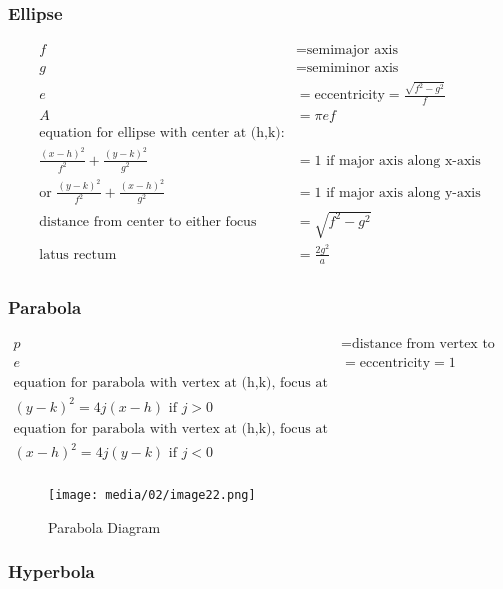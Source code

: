 \documentclass[
]{book}
\begin{document}
\hypertarget{ellipse}{%
\subsubsection*{Ellipse}\label{ellipse}}

\begin{align}
f &= \text{semimajor axis} \\
g &= \text{semiminor axis} \\
e &= \text{eccentricity} = \frac{ \sqrt{f^2 -g^2} }{f} \\
A &= \pi e f \\
\text{equation for ellipse with center at (h,k):} \\
\frac{(x-h)^2 }{f^2}  + \frac{(y-k)^2}{g^2}  &= 1 \text{ if major axis along x-axis} \\
\text{or } \frac{(y-k)^2 }{f^2}  + \frac{(x-h)^2}{g^2}  &= 1 \text{ if major axis along y-axis} \\
\text{distance from center to either focus} &= \sqrt{f^2 -g^2} \\
\text{latus rectum} &= \frac{2g^2}{a} \\
\end{align}

\hypertarget{parabola}{%
\subsubsection*{Parabola}\label{parabola}}

\begin{align}
p &= \text{distance from vertex to focus} \\
e &= \text{eccentricity} = 1 \\
\text{equation for parabola with vertex at (h,k), focus at (h+p,k):} \\
(y-k)^2  = 4j(x-h) \text{ if } j > 0 \\
\text{equation for parabola with vertex at (h,k), focus at (h,k+p):} \\
(x-h)^2  = 4j(y-k) \text{ if } j < 0 \\
\end{align}

\begin{figure}
\centering
\texttt{[image: media/02/image22.png]}
\caption{Parabola Diagram}
\end{figure}

\hypertarget{hyperbola}{%
\subsubsection*{Hyperbola}\label{hyperbola}}
\end{document}

